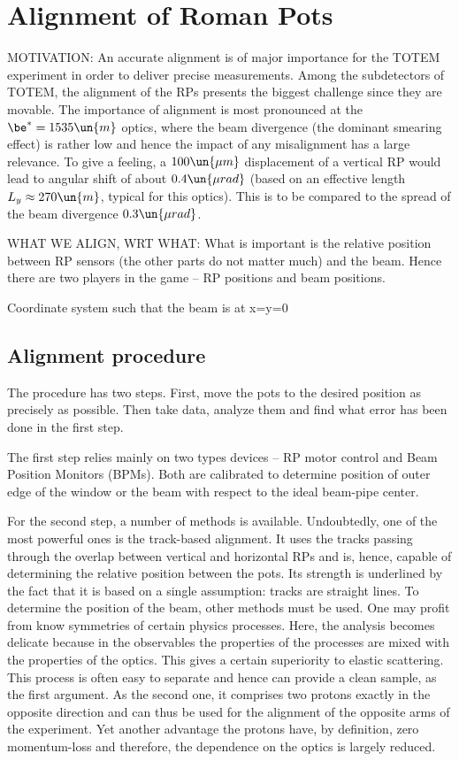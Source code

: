 \def\pmt#1{\hbox{\tt[#1]}}


\chapter[al]{Alignment of Roman Pots}

MOTIVATION: An accurate alignment is of major importance for the TOTEM experiment in order to deliver precise measurements. Among the subdetectors of TOTEM, the alignment of the RPs presents the biggest challenge since they are movable. The importance of alignment is most pronounced at the $\be^* = 1535\un{m}$ optics, where the beam divergence (the dominant smearing effect) is rather low and hence the impact of any misalignment has a large relevance. To give a feeling, a $100\un{\mu m}$ displacement of a vertical RP would lead to angular shift of about $0.4\un{\mu rad}$ (based on an effective length $L_y\approx 270\un{m}$, typical for this optics). This is to be compared to the spread of the beam divergence $0.3\un{\mu rad}$.


WHAT WE ALIGN, WRT WHAT:
What is important is the relative position between RP sensors (the other parts do not matter much) and the beam. Hence there are two players in the game -- RP positions and beam positions.

Coordinate system such that the beam is at x=y=0

\section[al proc]{Alignment procedure}
The procedure has two steps. First, move the pots to the desired position as precisely as possible. Then take data, analyze them and find what error has been done in the first step.

The first step relies mainly on two types devices -- RP motor control and Beam Position Monitors (BPMs). Both are calibrated to determine position of outer edge of the window or the beam with respect to the ideal beam-pipe center.

For the second step, a number of methods is available. Undoubtedly, one of the most powerful ones is the track-based alignment. It uses the tracks passing through the overlap between vertical and horizontal RPs and is, hence, capable of determining the relative position between the pots. Its strength is underlined by the fact that it is based on a single assumption: tracks are straight lines. To determine the position of the beam, other methods must be used. One may profit from know symmetries of certain physics processes. Here, the analysis becomes delicate because in the observables the properties of the processes are mixed with the properties of the optics. This gives a certain superiority to elastic scattering. This process is often easy to separate and hence can provide a clean sample, as the first argument. As the second one, it comprises two protons exactly in the opposite direction and can thus be used for the alignment of the opposite arms of the experiment. Yet another advantage the protons have, by definition, zero momentum-loss and therefore, the dependence on the optics is largely reduced.

